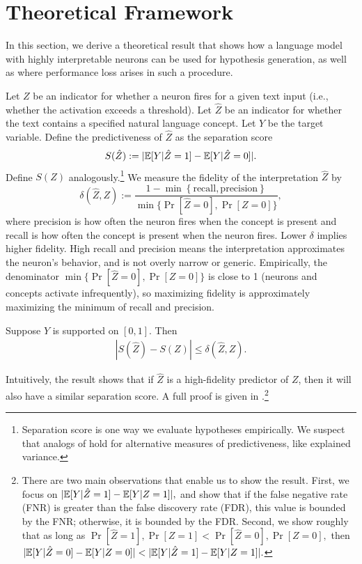 

\section{Theoretical Framework}
\label{sec:theory}

In this section, we derive a theoretical result that shows how a language model with highly interpretable neurons can be used for hypothesis generation, as well as where performance loss arises in such a procedure.

Let $Z$ be an indicator for whether a neuron fires for a given text input (i.e., whether the activation exceeds a threshold). Let $\hat{Z}$ be an indicator for whether the text contains a specified natural language concept. Let $Y$ be the target variable. Define the predictiveness of $\hat{Z}$ as the separation score $$S(\hat{Z}):=|\mathbb{E}[Y|\hat{Z}=1] - \mathbb{E}[Y|\hat{Z}=0]|.$$ Define $S(Z)$ analogously.\footnote{Separation score is one way we evaluate hypotheses empirically. We suspect that analogs of  hold for alternative measures of predictiveness, like explained variance.} 
We measure the fidelity of the interpretation $\hat{Z}$ by 
\begin{equation}
    \delta(\hat{Z}, Z) := \frac{1 - \min\left\{\text{recall}, \text{precision}\right\}}{\min\{\Pr[\hat{Z}=0],\Pr[Z=0]\}},
\end{equation}
where precision is how often the neuron fires when the concept is present and recall is how often the concept is present when the neuron fires. Lower $\delta$ implies higher fidelity. High recall and precision means the interpretation approximates the neuron's behavior, and is not overly narrow or generic. Empirically, the denominator $\min\{\Pr[\hat{Z}=0],\Pr[Z=0]\}$ is close to 1 (neurons and concepts activate infrequently), so maximizing fidelity is approximately maximizing the minimum of recall and precision.

\begin{proposition}\label{prop:errors-in-variables}
Suppose $Y$ is supported on $[0,1]$. Then 
\begin{align}
    |S(\hat{Z}) - S(Z)| \le \delta(\hat{Z}, Z).
\end{align}
\end{proposition}
Intuitively, the result shows that if $\hat{Z}$ is a high-fidelity predictor of $Z$, then it will also have a similar separation score. A full proof is given in .\footnote{There are two main observations that enable us to show the result. First, we focus on $|\mathbb{E}[Y|\hat{Z}=1]-\mathbb{E}[Y|Z=1]|,$ and show that if the false negative rate (FNR) is greater than the false discovery rate (FDR), this value is bounded by the FNR; otherwise, it is bounded by the FDR. Second, we show roughly that as long as $\Pr[\hat{Z}=1], \Pr[Z=1] < \Pr[\hat{Z}=0], \Pr[Z=0],$ then $|\mathbb{E}[Y|\hat{Z}=0]-\mathbb{E}[Y|Z=0]| < |\mathbb{E}[Y|\hat{Z}=1]-\mathbb{E}[Y|Z=1]|.$}


